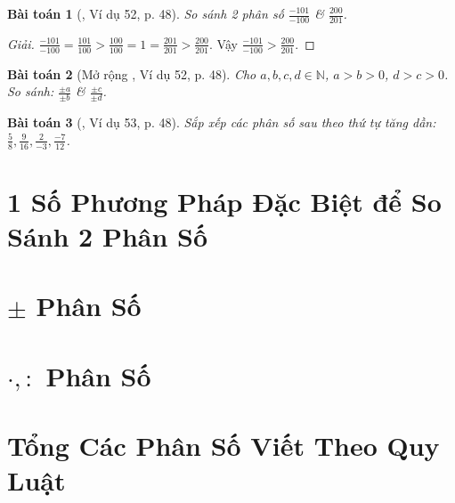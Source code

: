 \documentclass{article}
\numberwithin{equation}{section}
\newtheorem{baitoan}{Bài toán}
\begin{document}
\begin{baitoan}[\cite{Tuyen_Toan_6}, Ví dụ 52, p. 48]
	So sánh 2 phân số $\frac{-101}{-100}$ \& $\frac{200}{201}$.
\end{baitoan}

\begin{proof}[Giải]
	$\frac{-101}{-100} = \frac{101}{100} > \frac{100}{100} = 1 = \frac{201}{201} > \frac{200}{201}$. Vậy $\frac{-101}{-100} > \frac{200}{201}$.
\end{proof}

\begin{baitoan}[Mở rộng \cite{Tuyen_Toan_6}, Ví dụ 52, p. 48]
	Cho $a,b,c,d\in\mathbb{N}$, $a > b > 0$, $d > c > 0$. So sánh: $\frac{\pm a}{\pm b}$ \& $\frac{\pm c}{\pm d}$.
\end{baitoan}

\begin{baitoan}[\cite{Tuyen_Toan_6}, Ví dụ 53, p. 48]
	Sắp xếp các phân số sau theo thứ tự tăng dần: $\frac{5}{8},\frac{9}{16},\frac{2}{-3},\frac{-7}{12}$.
\end{baitoan}


\section{1 Số Phương Pháp Đặc Biệt để So Sánh 2 Phân Số}


\section{$\pm$ Phân Số}


\section{$\cdot,:$ Phân Số}


\section{Tổng Các Phân Số Viết Theo Quy Luật}

\end{document}
